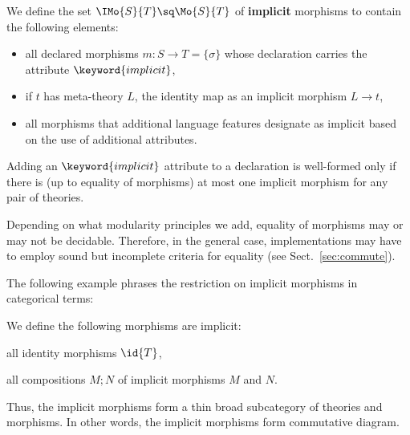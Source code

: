 \begin{definition}
We define the set $\IMo{S}{T}\sq\Mo{S}{T}$ of \textbf{implicit} morphisms to contain the following elements:
\begin{itemize}
 \item all declared morphisms $m:S\to T=\{\sigma\}$ whose declaration carries the attribute $\keyword{implicit}$,
 \item if $t$ has meta-theory $L$, the identity map as an implicit morphism $L\to t$,
 \item all morphisms that additional language features designate as implicit based on the use of additional attributes.
\end{itemize}

Adding an $\keyword{implicit}$ attribute to a declaration is well-formed only if there is (up to equality of morphisms) at most one implicit morphism for any pair of theories.
\end{definition}

Depending on what modularity principles we add, equality of morphisms may or may not be decidable.
Therefore, in the general case, implementations may have to employ sound but incomplete criteria for equality (see Sect.~\ref{sec:commute}).

The following example phrases the restriction on implicit morphisms in categorical terms:
\begin{example}\label{impl:cat}
We define the following morphisms are implicit:
\begin{compactitem}
 \item all identity morphisms $\id{T}$,
 \item all compositions $M;N$ of implicit morphisms $M$ and $N$.
\end{compactitem}
Thus, the implicit morphisms form a thin broad subcategory of theories and morphisms.
In other words, the implicit morphisms form commutative diagram.
\end{example}

